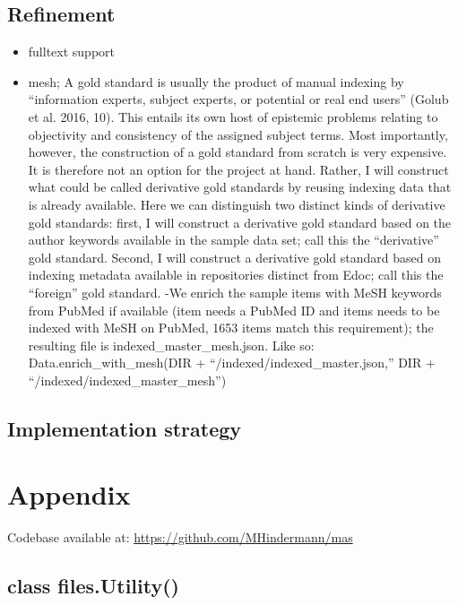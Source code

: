 \hypertarget{refinement}{%
\subsection{Refinement}\label{refinement}}

\begin{itemize}
\tightlist
\item
  fulltext support
\item
  mesh; A gold standard is usually the product of manual indexing by
  ``information experts, subject experts, or potential or real end
  users'' (Golub et al. 2016, 10). This entails its own host of
  epistemic problems relating to objectivity and consistency of the
  assigned subject terms. Most importantly, however, the construction of
  a gold standard from scratch is very expensive. It is therefore not an
  option for the project at hand. Rather, I will construct what could be
  called derivative gold standards by reusing indexing data that is
  already available. Here we can distinguish two distinct kinds of
  derivative gold standards: first, I will construct a derivative gold
  standard based on the author keywords available in the sample data
  set; call this the ``derivative'' gold standard. Second, I will
  construct a derivative gold standard based on indexing metadata
  available in repositories distinct from Edoc; call this the
  ``foreign'' gold standard. -We enrich the sample items with MeSH
  keywords from PubMed if available (item needs a PubMed ID and items
  needs to be indexed with MeSH on PubMed, 1653 items match this
  requirement); the resulting file is indexed\_master\_mesh.json. Like
  so: Data.enrich\_with\_mesh(DIR + ``/indexed/indexed\_master.json,''
  DIR + ``/indexed/indexed\_master\_mesh'')
\end{itemize}

\hypertarget{implementation-strategy}{%
\subsection{Implementation strategy}\label{implementation-strategy}}

\hypertarget{appendix}{%
\section{Appendix}\label{appendix}}

Codebase available at: \url{https://github.com/MHindermann/mas}

\hypertarget{class-files.utility}{%
\subsection{class files.Utility()}\label{class-files.utility}}


